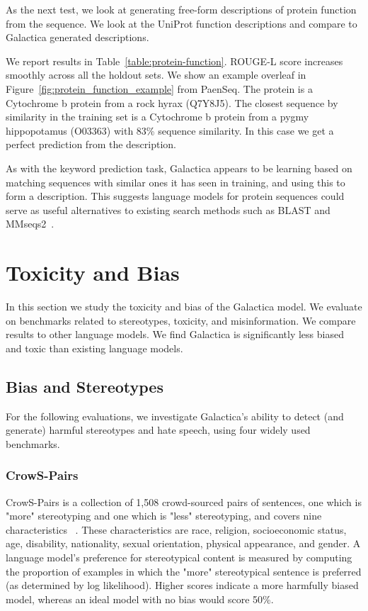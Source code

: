 {As the next test, we look at generating free-form descriptions of protein function from the sequence. We look at the UniProt function descriptions and compare to Galactica generated descriptions.

We report results in Table~\ref{table:protein-function}. ROUGE-L score increases smoothly across all the holdout sets. We show an example overleaf in Figure~\ref{fig:protein_function_example} from PaenSeq. The protein is a Cytochrome b protein from a rock hyrax (Q7Y8J5). The closest sequence by similarity in the training set is a Cytochrome b protein from a pygmy hippopotamus (O03363) with 83\% sequence similarity. In this case we get a perfect prediction from the description.

As with the keyword prediction task, Galactica appears to be learning based on matching sequences with similar ones it has seen in training, and using this to form a description. This suggests language models for protein sequences could serve as useful alternatives to existing search methods such as BLAST and MMseqs2~\citep{BLAST, MMseq2}.

\section{Toxicity and Bias}

In this section we study the toxicity and bias of the Galactica model. We evaluate on benchmarks related to stereotypes, toxicity, and misinformation. We compare results to other language models. We find Galactica is significantly less biased and toxic than existing language models.

\subsection{Bias and Stereotypes}

For the following evaluations, we investigate Galactica’s ability to detect (and generate) harmful stereotypes and hate speech, using four widely used benchmarks. 

\subsubsection{CrowS-Pairs}

CrowS-Pairs is a collection of 1,508 crowd-sourced pairs of sentences, one which is "more" stereotyping and one which is "less" stereotyping, and covers nine characteristics ~\citep{crows}. These characteristics are race, religion, socioeconomic status, age, disability, nationality, sexual orientation, physical appearance, and gender. A language model’s preference for stereotypical content is measured by computing the proportion of examples in which the "more" stereotypical sentence is preferred (as determined by log likelihood). Higher scores indicate a more harmfully biased model, whereas an ideal model with no bias would score 50\%.

}
